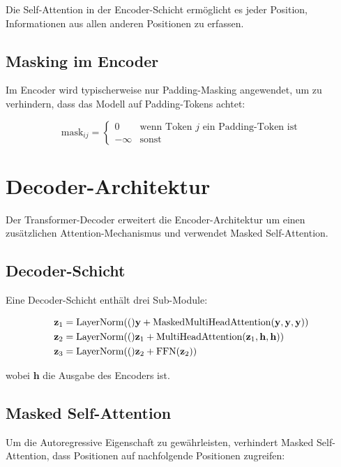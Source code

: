 Die Self-Attention in der Encoder-Schicht ermöglicht es jeder Position, Informationen aus allen anderen Positionen zu erfassen.

\subsection{Masking im Encoder}

Im Encoder wird typischerweise nur Padding-Masking angewendet, um zu verhindern, dass das Modell auf Padding-Tokens achtet:

\begin{equation}
\text{mask}_{ij} = \begin{cases}
0 & \text{wenn Token $j$ ein Padding-Token ist} \\
-\infty & \text{sonst}
\end{cases}
\end{equation}

\section{Decoder-Architektur}

Der Transformer-Decoder erweitert die Encoder-Architektur um einen zusätzlichen Attention-Mechanismus und verwendet Masked Self-Attention.

\subsection{Decoder-Schicht}

Eine Decoder-Schicht enthält drei Sub-Module:

\begin{align}
\mathbf{z}_1 &= \text{LayerNorm}(()\mathbf{y} + \text{MaskedMultiHeadAttention}(\mathbf{y}, \mathbf{y}, \mathbf{y})) \\
\mathbf{z}_2 &= \text{LayerNorm}(()\mathbf{z}_1 + \text{MultiHeadAttention}(\mathbf{z}_1, \mathbf{h}, \mathbf{h})) \\
\mathbf{z}_3 &= \text{LayerNorm}(()\mathbf{z}_2 + \text{FFN}(\mathbf{z}_2))
\end{align}

wobei $\mathbf{h}$ die Ausgabe des Encoders ist.

\subsection{Masked Self-Attention}

Um die Autoregressive Eigenschaft zu gewährleisten, verhindert Masked Self-Attention, dass Positionen auf nachfolgende Positionen zugreifen:

